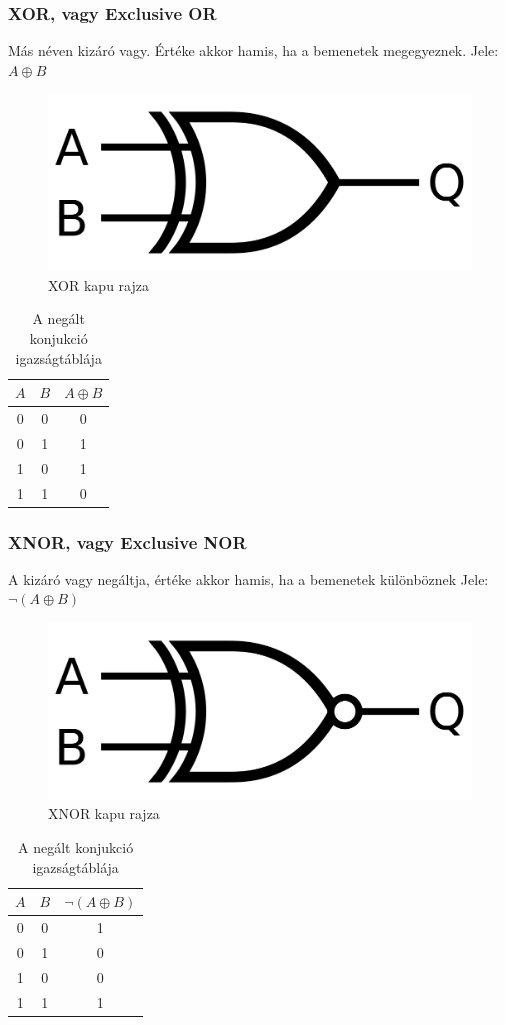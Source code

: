\documentclass[
]{thesis-ekf}
\theoremstyle{definition}
\theoremstyle{remark}
\begin{document}
\subsubsection{XOR, vagy Exclusive OR}
Más néven kizáró vagy. Értéke akkor hamis, ha a bemenetek megegyeznek. Jele: $A \oplus B$

\begin{figure}[H]
	\centering
	\includegraphics[width=0.3\linewidth]{xor}
	\caption{XOR kapu rajza}
	\label{fig:xor}
\end{figure}


\begin{table}[H]
	\centering
	\begin{tabular}{c|c|c}
		$A$ & $B$ & $A \oplus B$\\               
		\hline
		0 & 0 & 0\\
		0 & 1 & 1\\
		1 & 0 & 1\\
		1 & 1 & 0
	\end{tabular}
	\caption{A negált konjukció igazságtáblája}
\end{table}


\subsubsection{XNOR, vagy Exclusive NOR}
A kizáró vagy negáltja, értéke akkor hamis, ha a bemenetek különböznek Jele: $\neg (A \oplus B)$

\begin{figure}[H]
	\centering
	\includegraphics[width=0.3\linewidth]{xnor}
	\caption{XNOR kapu rajza}
	\label{fig:xnor}
\end{figure}


\begin{table}[H]
	\centering
	\begin{tabular}{c|c|c}
		$A$ & $B$ & $\neg (A \oplus B)$\\               
		\hline
		0 & 0 & 1\\
		0 & 1 & 0\\
		1 & 0 & 0\\
		1 & 1 & 1
	\end{tabular}
	\caption{A negált konjukció igazságtáblája}
\end{table}
\end{document}

